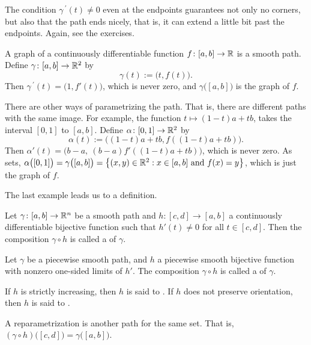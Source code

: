 The condition $\gamma^{\:\prime}(t) \not= 0$ even at the endpoints guarantees
not only no corners, but also that the path ends nicely, that is, it can
extend a little bit past the endpoints.  Again, see the exercises.

\begin{example}
A graph of a continuously differentiable function $f \colon [a,b] \to {\mathbb{R}}$ is a smooth path.
Define $\gamma \colon [a,b] \to {\mathbb{R}}^2$ by
\begin{equation*}
\gamma(t) := \bigl(t,f(t)\bigr) .
\end{equation*}
Then $\gamma^{\:\prime}(t) = \bigl( 1 , f'(t) \bigr)$, which is never zero,
and $\gamma\bigl([a,b]\bigr)$ is the graph of $f$.

There are other ways of parametrizing the path.  That is, there are
different paths with the same image.  For example,
the function $t \mapsto (1-t)a+tb$, takes the interval $[0,1]$ to $[a,b]$.
Define
$\alpha \colon [0,1] \to {\mathbb{R}}^2$ by
\begin{equation*}
\alpha(t) := \bigl((1-t)a+tb,f((1-t)a+tb)\bigr) .
\end{equation*}
Then
$\alpha'(t) = \bigl( b-a ,~ (b-a)f'((1-t)a+tb) \bigr)$, which is never zero.
As sets, $\alpha\bigl([0,1]\bigr) = \gamma\bigl([a,b]\bigr)
= \bigl\{ (x,y) \in {\mathbb{R}}^2 : x \in [a,b] \text{ and } f(x) = y \bigr\}$,
which is just the graph of $f$.
\end{example}

The last example leads us to a definition.

\begin{defn}
Let $\gamma \colon [a,b] \to {\mathbb{R}}^n$ be a smooth path and
$h \colon [c,d] \to [a,b]$ a continuously differentiable bijective function
such that $h'(t) \not= 0$ for all $t \in [c,d]$.  Then
the composition
$\gamma \circ h$ is called a
\emph{}
of $\gamma$.

Let $\gamma$ be a piecewise smooth path, and
$h$ a piecewise smooth bijective function with
nonzero one-sided limits of $h'$.
The composition
$\gamma \circ h$ is called a
\emph{} of $\gamma$.

If $h$ is strictly increasing, then $h$ is 
said to \emph{}.  If $h$ does not preserve
orientation, then $h$ is said to \emph{}.
\end{defn}

A reparametrization is another path for the same set.  That is,
$(\gamma \circ h)\bigl([c,d]\bigr) =
\gamma \bigl([a,b]\bigr)$.

